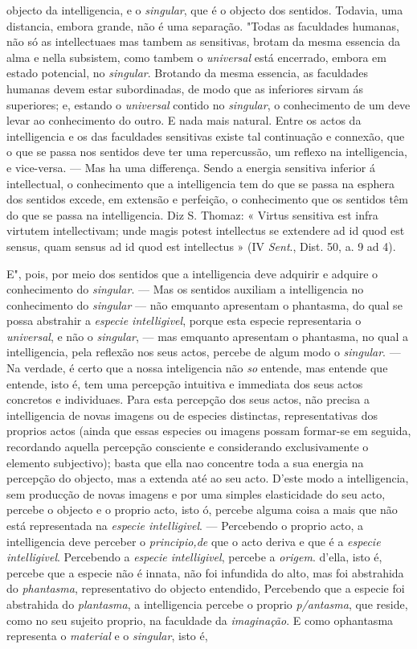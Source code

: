 objecto da intelligencia, e o \emph{singular}, que é o objecto dos sentidos. Todavia, uma distancia, embora grande, não é uma separação. "Todas as faculdades humanas, não só as intellectuaes mas tambem as sensitivas, brotam da mesma essencia da alma e nella subsistem, como tambem o \emph{universal} está encerrado, embora em estado potencial, no \emph{singular}. Brotando da mesma essencia, as faculdades humanas devem estar subordinadas, de modo que as inferiores sirvam ás superiores; e, estando o \emph{universal} contido no \emph{singular}, o conhecimento de um deve levar ao conhecimento do outro. E nada mais natural. Entre os actos da intelligencia e os das faculdades sensitivas existe tal continuação e connexão, que o que se passa nos sentidos deve ter uma repercussão, um reflexo na intelligencia, e vice-versa. --- Mas ha uma differença. Sendo a energia sensitiva inferior á intellectual, o conhecimento que a intelligencia tem do que se passa na esphera dos sentidos excede, em extensão e perfeição, o conhecimento que os sentidos têm do que se passa na intelligencia. Diz S. Thomaz: « Virtus sensitiva est infra virtutem intellectivam; unde magis potest intellectus se extendere ad id quod est sensus, quam sensus ad id quod est intellectus » (IV \emph{Sent}., Dist. 50, a. 9 ad 4).\par E", pois, por meio dos sentidos que a intelligencia deve adquirir e adquire o conhecimento do \emph{singular}. --- Mas os sentidos auxiliam a intelligencia no conhecimento do \emph{singular} --- não emquanto apresentam o phantasma, do qual se possa abstrahir a \emph{especie intelligivel}, porque esta especie representaria o \emph{universal}, e não o \emph{singular}, --- mas emquanto apresentam o phantasma, no qual a intelligencia, pela reflexão nos seus actos, percebe de algum modo o \emph{singular}. --- Na verdade, é certo que a nossa inteligencia não \emph{so} entende, mas entende que entende, isto é, tem uma percepção intuitiva e immediata dos seus actos concretos e individuaes. Para esta percepção dos seus actos, não precisa a intelligencia de novas imagens ou de especies distinctas, representativas dos proprios actos (ainda que essas especies ou imagens possam formar-se em seguida, recordando aquella percepção consciente e considerando exclusivamente o elemento subjectivo); basta que ella nao concentre toda a sua energia na percepção do objecto, mas a extenda até ao seu acto. D'este modo a intelligencia, sem producção de novas imagens e por uma simples elasticidade do seu acto, percebe o objecto e o proprio acto, isto ó, percebe alguma coisa a mais que não está representada na \emph{especie intelligivel}. --- Percebendo o proprio acto, a intelligencia deve perceber o \emph{principio,de} que o acto deriva e que é a \emph{especie intelligivel}. Percebendo a \emph{especie intelligivel}, percebe a \emph{origem}. d'ella, isto é, percebe que a especie não é innata, não foi infundida do alto, mas foi abstrahida do \emph{phantasma}, representativo do objecto entendido, Percebendo que a especie foi abstrahida do \emph{plantasma}, a intelligencia percebe o proprio \emph{p/antasma}, que reside, como no seu sujeito proprio, na faculdade da \emph{imaginação}. E como ophantasma representa o \emph{material} e o \emph{singular}, isto é, 
